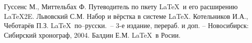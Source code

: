 \begin{thebibliography}{99}
   Гуссенс М., Миттельбах Ф. Путеводитель по пкету \LaTeX\ и его расширению \LaTeX2E.
   Львовский С.М. Набор и вёрстка в системе \LaTeX.
   Котельников И.А., Чеботарёв П.З. \LaTeX\ по–русски.~– 3-е издание, перераб. и доп. – Новосибирск: Сибирский хронограф, 2004.
   Балдин Е.М. \LaTeX\ в Росии.
\end{thebibliography}

